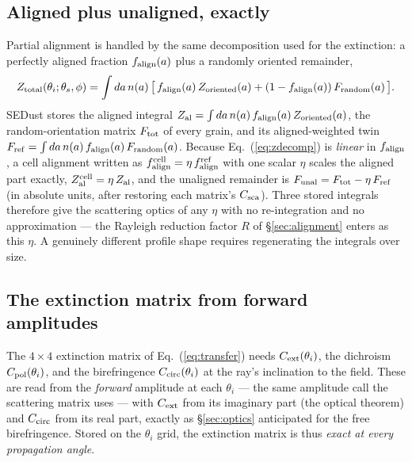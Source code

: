 \documentclass{my_memo}
\newcommand{\Cext}{\ensuremath{C_{\rm ext}}}
\newcommand{\Cpol}{\ensuremath{C_{\rm pol}}}
\newcommand{\Ccirc}{\ensuremath{C_{\rm circ}}}
\newcommand{\falign}{\ensuremath{f_{\rm align}}}
\begin{document}
\subsection{Aligned plus unaligned, exactly}

Partial alignment is handled by the same decomposition used for the extinction: a
perfectly aligned fraction $\falign(a)$ plus a randomly oriented remainder,
\begin{equation}
  Z_{\rm total}(\theta_i;\theta_s,\phi) = \int da\,n(a)\,
    \bigl[\,\falign(a)\,Z_{\rm oriented}(a) + (1-\falign(a))\,F_{\rm random}(a)\,
    \bigr].
  \label{eq:zdecomp}
\end{equation}
SEDust stores the aligned integral $Z_{\rm al} = \int da\,n(a)\,\falign(a)\,
Z_{\rm oriented}(a)$, the random-orientation matrix $F_{\rm tot}$ of every grain,
and its aligned-weighted twin $F_{\rm ref} = \int da\,n(a)\,\falign(a)\,
F_{\rm random}(a)$. Because Eq.~(\ref{eq:zdecomp}) is \emph{linear} in $\falign$,
a cell alignment written as $\falign^{\rm cell} = \eta\,\falign^{\rm ref}$ with one
scalar $\eta$ scales the aligned part exactly, $Z_{\rm al}^{\rm cell} = \eta\,
Z_{\rm al}$, and the unaligned remainder is $F_{\rm unal} = F_{\rm tot} - \eta\,
F_{\rm ref}$ (in absolute units, after restoring each matrix's $C_{\rm sca}$). Three
stored integrals therefore give the scattering optics of any $\eta$ with no
re-integration and no approximation --- the Rayleigh reduction factor $R$ of
\S\ref{sec:alignment} enters as this $\eta$. A genuinely different profile shape
requires regenerating the integrals over size.

\subsection{The extinction matrix from forward amplitudes}

The $4\times4$ extinction matrix of Eq.~(\ref{eq:transfer}) needs $\Cext(\theta_i)$,
the dichroism $\Cpol(\theta_i)$, and the birefringence $\Ccirc(\theta_i)$ at the
ray's inclination to the field. These are read from the \emph{forward} amplitude
at each $\theta_i$ --- the same amplitude call the scattering matrix uses ---
with $\Cext$ from its imaginary part (the optical theorem) and $\Ccirc$ from its
real part, exactly as \S\ref{sec:optics} anticipated for the free birefringence.
Stored on the $\theta_i$ grid, the extinction matrix is thus \emph{exact at every
propagation angle}.
\end{document}
